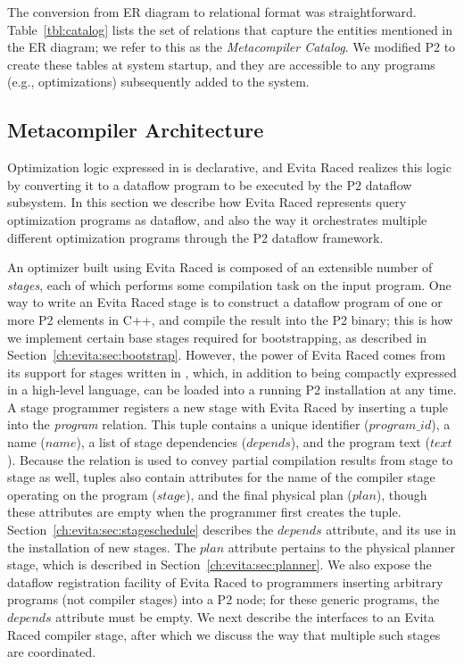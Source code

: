 The conversion from ER diagram to relational format was straightforward. Table~\ref{tbl:catalog} lists the set of relations that capture the entities 
mentioned in the ER diagram; we refer to this as the {\em Metacompiler Catalog}. We modified P2 to create these tables
at system startup, and they are accessible to any \OVERLOG programs (e.g., optimizations) subsequently added to the system.

\subsection{Metacompiler Architecture}
\label{ch:evita:sec:metaarch}
Optimization logic expressed in \OVERLOG is declarative, and Evita Raced realizes this logic by converting it to a dataflow program to be executed by the P2 dataflow subsystem.  In this section we describe how Evita Raced represents query optimization programs as dataflow, and also the way it orchestrates multiple different optimization programs through the P2 dataflow framework.

An optimizer built using Evita Raced is composed of an extensible number of {\em stages}, each of which performs some
compilation task on the input program. One way to write an Evita Raced stage is to construct a dataflow program of one or more P2 elements in C++, and compile the result into the P2 binary; this is how we implement certain base stages required for bootstrapping, as described in Section~\ref{ch:evita:sec:bootstrap}.  However, the power of Evita Raced comes from its support for stages written in \OVERLOG, which, in addition to being compactly expressed in a high-level language, can be loaded into a running P2 installation at any time. 
A stage programmer registers a new stage with Evita Raced by inserting a tuple into the {\em program} relation. 
This tuple contains a unique identifier ($program\_id$), a name
($name$),  a list of stage dependencies ($depends$), and the program
text ($text$). Because the  relation is used to convey
partial compilation results from stage to stage as well, 
tuples also contain attributes for the name of the compiler stage operating 
on the program ($stage$), and the final physical plan ($plan$), though
these attributes are empty when the programmer first creates the tuple. Section~\ref{ch:evita:sec:stageschedule} describes the
$depends$ attribute, and its use in the installation of new stages. The $plan$ attribute pertains to the
physical planner stage, which is described in Section~\ref{ch:evita:sec:planner}.
We also expose the dataflow registration facility of Evita Raced to programmers inserting arbitrary
\OVERLOG programs  (not compiler stages) into a P2 node; for these generic programs, the $depends$ attribute must be empty.  We next describe the 
interfaces to an Evita Raced compiler stage, after which we discuss the way that multiple such stages are coordinated.

